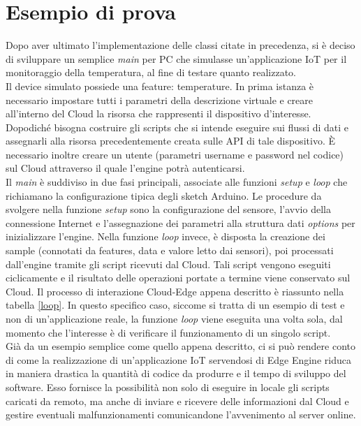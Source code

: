 \section{Esempio di prova}\label{prova}
Dopo aver ultimato l’implementazione delle classi citate in precedenza, si è deciso di sviluppare un semplice \textit{main} per PC che simulasse un’applicazione IoT per il monitoraggio della temperatura, al fine di testare quanto realizzato.\\
Il device simulato possiede una feature: temperature. In prima istanza è necessario impostare tutti i parametri della descrizione virtuale e creare all'interno del Cloud la risorsa che rappresenti il dispositivo d’interesse. Dopodiché bisogna costruire gli scripts che si intende eseguire sui flussi di dati e assegnarli alla risorsa precedentemente creata sulle API di tale dispositivo. È necessario inoltre creare un utente (parametri username e password nel codice) sul Cloud attraverso il quale l'engine potrà autenticarsi.\\
Il \textit{main} è suddiviso in due fasi principali, associate alle funzioni  \textit{setup} e  \textit{loop} che richiamano la configurazione tipica degli sketch Arduino. Le procedure da svolgere nella funzione  \textit{setup} sono la configurazione del sensore, l'avvio della connessione Internet e l'assegnazione dei parametri alla struttura dati \textit{options} per inizializzare l'engine. Nella funzione \textit{loop} invece, è disposta la creazione dei sample (connotati da features, data e valore letto dai sensori), poi processati dall'engine tramite gli script ricevuti dal Cloud. Tali script vengono eseguiti ciclicamente e il risultato delle operazioni portate a termine viene conservato sul Cloud. Il processo di interazione Cloud-Edge appena descritto è riassunto nella tabella \ref{loop}. In questo specifico caso, siccome si tratta di un esempio di test e non di un'applicazione reale, la funzione \textit{loop} viene eseguita una volta sola, dal momento che l'interesse è di verificare il funzionamento di un singolo script.\\
Già da un esempio semplice come quello appena descritto, ci si può rendere conto di come la realizzazione di un'applicazione IoT servendosi di Edge Engine riduca in maniera drastica la quantità di codice da produrre e il tempo di sviluppo del software. Esso fornisce la possibilità non solo di eseguire in locale gli scripts caricati da remoto, ma anche di inviare e ricevere delle informazioni dal Cloud e gestire eventuali malfunzionamenti comunicandone l'avvenimento al server online.
